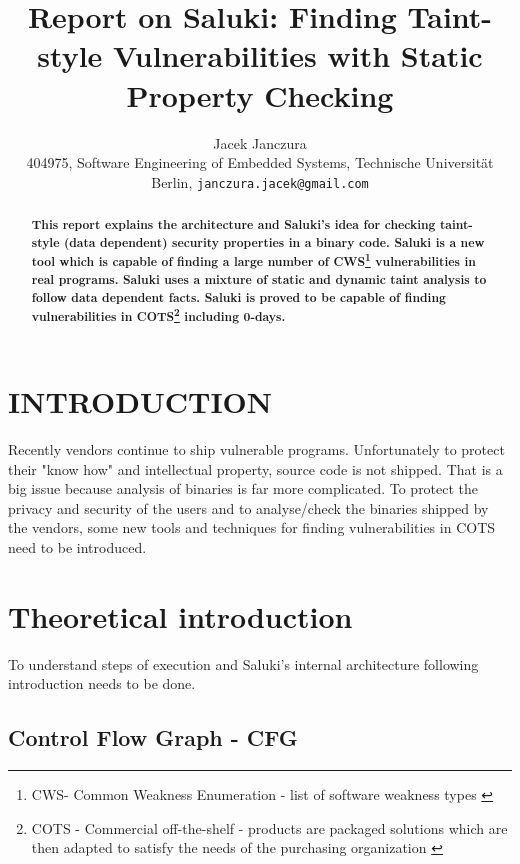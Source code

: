 \documentclass[a4paper, 12pt, journal, onecolumn]{IEEEtran}
\title{\LARGE \bf
Report on Saluki: Finding Taint-style Vulnerabilities with Static Property Checking
}
\author{Jacek Janczura \\ \small{404975, Software Engineering of Embedded Systems, Technische Universität Berlin, {\tt janczura.jacek@gmail.com}}}%
\begin{document}
\maketitle
\thispagestyle{fancy}
\pagestyle{fancy}


\begin{abstract}
\textbf{This report explains the architecture and Saluki's idea for checking taint-style (data dependent) security properties in a binary code. Saluki is a new tool which is capable of finding a large number of CWS\footnote{CWS- Common Weakness Enumeration - list of software weakness types \cite{a2}} vulnerabilities in real programs. Saluki uses a mixture of static and dynamic taint analysis to follow data dependent facts. Saluki is proved to be capable of finding vulnerabilities in COTS\footnote{ COTS - Commercial off-the-shelf -  products are packaged solutions which are then adapted to satisfy the needs of the purchasing organization \cite{a1}} including 0-days.}

\end{abstract}


\section{INTRODUCTION}

Recently vendors continue to ship vulnerable programs. Unfortunately to protect their "know how" and intellectual property, source code is not shipped. That is a big issue because analysis of binaries is far more complicated. To protect the privacy and security of the users and to analyse/check the binaries shipped by the vendors, some new tools and techniques for finding vulnerabilities in COTS need to be introduced. \cite{saluki} 

\section{Theoretical introduction}

To understand steps of execution and Saluki's internal architecture following introduction needs to be done.

\subsection{Control Flow Graph - CFG}
\end{document}
